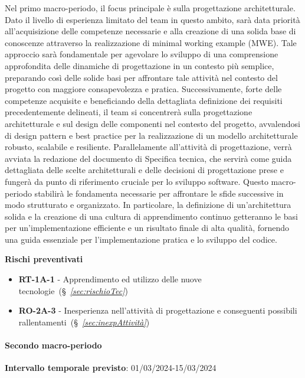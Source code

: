 Nel primo macro-periodo, il focus principale è sulla progettazione architetturale. Dato il livello di esperienza limitato del team in questo ambito, sarà data priorità all'acquisizione delle competenze necessarie e alla creazione di una solida base di conoscenze attraverso la realizzazione di minimal working example (MWE). Tale approccio sarà fondamentale per agevolare lo sviluppo di una comprensione approfondita delle dinamiche di progettazione in un contesto più semplice, preparando così delle solide basi per affrontare tale attività nel contesto del progetto con maggiore consapevolezza e pratica.
Successivamente, forte delle competenze acquisite e beneficiando della dettagliata definizione dei requisiti precedentemente delineati, il team si concentrerà sulla progettazione architetturale e sul design delle componenti nel contesto del progetto, avvalendosi di design pattern e best practice per la realizzazione di un modello architetturale robusto, scalabile e resiliente.
Parallelamente all’attività di progettazione, verrà avviata la redazione del documento di Specifica tecnica, che servirà come guida dettagliata delle scelte architetturali e delle decisioni di progettazione prese e fungerà da punto di riferimento cruciale per lo sviluppo software.
Questo macro-periodo stabilirà le fondamenta necessarie per affrontare le sfide successive in modo strutturato e organizzato. In particolare, la definizione di un'architettura solida e la creazione di una cultura di apprendimento continuo getteranno le basi per un'implementazione efficiente e un risultato finale di alta qualità, fornendo una guida essenziale per l'implementazione pratica e lo sviluppo del codice.

\vspace{0.4cm}

\textbf{Rischi preventivati}
\begin{itemize}
    \item \textbf{RT-1A-1} - Apprendimento ed utilizzo delle nuove tecnologie~(\S~\textit{\ref{sec:rischioTec}})
    \item \textbf{RO-2A-3} - Inesperienza nell’attività di progettazione e conseguenti possibili rallentamenti~(\S~\textit{\ref{sec:inexpAttività}})
\end{itemize}

\paragraph{Secondo macro-periodo}

\textbf{Intervallo temporale previsto}: 01/03/2024-15/03/2024 \\


